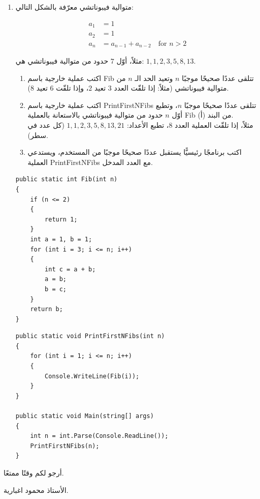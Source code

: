 \documentclass[14pt]{extarticle}
\begin{document}
\begin{enumerate}[resume, itemsep=2em]
\item متوالية فيبوناتشي معرّفة بالشكل التالي:
\begin{english}
\begin{align*}
    a_1 &= 1 \\
    a_2 &= 1 \\
    a_n &= a_{n-1} + a_{n-2} \quad \text{for } n > 2
\end{align*}
\end{english}
مثلاً، أوّل $7$ حدود من متوالية فيبوناتشي هي: $1, 1, 2, 3, 5, 8, 13$.
\begin{enumerate}
    \item اكتب عملية خارجية باسم \textenglish{Fib} تتلقى عددًا صحيحًا موجبًا $n$ وتعيد الحد الـ $n$ من متوالية فيبوناتشي (مثلاً: إذا تلقّت العدد $3$ تعيد $2$، وإذا تلقّت $6$ تعيد $8$).
    \item اكتب عملية خارجية باسم \textenglish{PrintFirstNFibs} تتلقى عددًا صحيحًا موجبًا $n$، وتطبع أوّل $n$ حدود من متوالية فيبوناتشي بالاستعانة بالعملية \textenglish{Fib} من البند (أ). \\
    مثلاً، إذا تلقّت العملية العدد $8$، تطبع الأعداد: $1, 1, 2, 3, 5, 8, 13, 21$ (كل عدد في سطر).
    \item اكتب برنامجًا رئيسيًّا يستقبل عددًا صحيحًا موجبًا من المستخدم، ويستدعي العملية \textenglish{PrintFirstNFibs} مع العدد المدخل.
\end{enumerate}
\ifwithsols
\begin{boxSolution}[فرع أ]
\begin{english}
\begin{verbatim}
public static int Fib(int n)
{
    if (n <= 2)
    {
        return 1;
    }
    int a = 1, b = 1;
    for (int i = 3; i <= n; i++)
    {
        int c = a + b;
        a = b;
        b = c;
    }
    return b;
}
\end{verbatim}
\end{english}
\end{boxSolution}

\filbreak

\begin{boxSolution}[فرع ب و ج]
\begin{english}
\begin{verbatim}
public static void PrintFirstNFibs(int n)
{
    for (int i = 1; i <= n; i++)
    {
        Console.WriteLine(Fib(i));
    }
}

public static void Main(string[] args)
{
    int n = int.Parse(Console.ReadLine());
    PrintFirstNFibs(n);
}
\end{verbatim}
\end{english}
\end{boxSolution}
\fi
\filbreak

\end{enumerate}

\vspace{1cm}
\begin{flushleft}
أرجو لكم وقتًا ممتعًا.

الأستاذ محمود اغبارية.
\end{flushleft}
\end{document}
